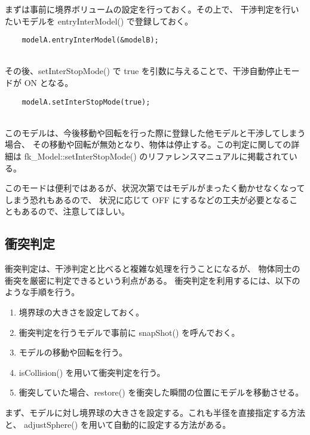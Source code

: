 まずは事前に境界ボリュームの設定を行っておく。その上で、
干渉判定を行いたいモデルを entryInterModel() で登録しておく。
\\
\begin{breakbox}
\begin{verbatim}
    modelA.entryInterModel(&modelB);
\end{verbatim}
\end{breakbox}
~ \\
その後、setInterStopMode() で true を引数に与えることで、干渉自動停止モードが ON となる。
\\
\begin{breakbox}
\begin{verbatim}
    modelA.setInterStopMode(true);
\end{verbatim}
\end{breakbox}
~ \\
このモデルは、今後移動や回転を行った際に登録した他モデルと干渉してしまう場合、
その移動や回転が無効となり、物体は停止する。この判定に関しての詳細は
fk\_Model::setInterStopMode() のリファレンスマニュアルに掲載されている。

このモードは便利ではあるが、状況次第ではモデルがまったく動かせなくなってしまう恐れもあるので、
状況に応じて OFF にするなどの工夫が必要となることもあるので、注意してほしい。

\subsection{衝突判定}
衝突判定は、干渉判定と比べると複雑な処理を行うことになるが、
物体同士の衝突を厳密に判定できるという利点がある。
衝突判定を利用するには、以下のような手順を行う。
\begin{enumerate}
 \item 境界球の大きさを設定しておく。
 \item 衝突判定を行うモデルで事前に snapShot() を呼んでおく。
 \item モデルの移動や回転を行う。
 \item isCollision() を用いて衝突判定を行う。
 \item 衝突していた場合、restore() を衝突した瞬間の位置にモデルを移動させる。
\end{enumerate}

まず、モデルに対し境界球の大きさを設定する。これも半径を直接指定する方法と、
adjustSphere() を用いて自動的に設定する方法がある。

